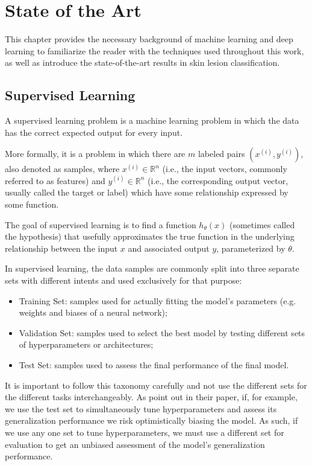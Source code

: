 \chapter{State of the Art}
\label{chapter:sota}

This chapter provides the necessary background of machine learning and deep learning to familiarize the reader with the techniques used throughout this work, as well as introduce the state-of-the-art results in skin lesion classification.

\section{Supervised Learning}

A supervised learning problem is a machine learning problem in which the data has the correct expected output for every input.

More formally, it is a problem in which there are $m$ labeled pairs $(x^{(i)}, y^{(i)})$, also denoted as samples, where $x^{(i)} \in \mathbb{R}^n$ (i.e., the input vectors, commonly referred to as features) and $y^{(i)} \in \mathbb{R}^n$ (i.e., the corresponding output vector, usually called the target or label) which have some relationship expressed by some function.

The goal of supervised learning is to find a function $h_{\theta}(x)$ (sometimes called the hypothesis) that usefully approximates the true function in the underlying relationship between the input $x$ and associated output $y$, parameterized by $\theta$.

In supervised learning, the data samples are commonly split into three separate sets with different intents and used exclusively for that purpose:

\begin{itemize}
    \item Training Set: samples used for actually fitting the model's parameters (e.g. weights and biases of a neural network);
    \item Validation Set: samples used to select the best model by testing different sets of hyperparameters or architectures;
    \item Test Set: samples used to assess the final performance of the final model.
\end{itemize}

It is important to follow this taxonomy carefully and not use the different sets for the different tasks interchangeably. As \citeauthor{crossvalidationbias} point out in their \citeyear{crossvalidationbias} paper, if, for example, we use the test set to simultaneously tune hyperparameters and assess its generalization performance we risk optimistically biasing the model. As such, if we use any one set to tune hyperparameters, we must use a different set for evaluation to get an unbiased assessment of the model's generalization performance.

